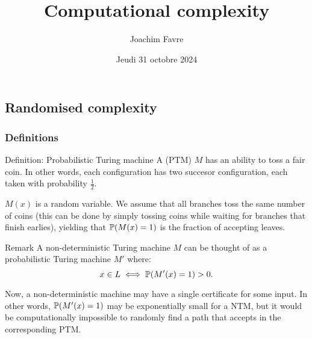 \documentclass[a4paper]{article}
\title{Computational complexity}
\author{Joachim Favre}
\date{Jeudi 31 octobre 2024}
\begin{document}
\maketitle


\subsection{Randomised complexity}

\subsubsection{Definitions}


\begin{parag}{Definition: Probabilistic Turing machine}
    A  (PTM) $M$ has an ability to toss a fair coin. In other words, each configuration has two succesor configuration, each taken with probability $\frac{1}{2}$.

    $M\left(x\right)$ is a random variable. We assume that all branches toss the same number of coins (this can be done by simply tossing coins while waiting for branches that finish earlies), yielding that $\prob\left(M\left(x\right) = 1\right)$ is the fraction of accepting leaves.

    \begin{subparag}{Remark}
        A non-deterministic Turing machine $M$ can be thought of as a probabilistic Turing machine $M'$ where: 
        \[x \in L \iff \prob\left(M'\left(x\right) = 1\right) > 0.\]

        Now, a non-deterministic machine may have a single certificate for some input. In other words, $\prob\left(M'\left(x\right) = 1\right)$ may be exponentially small for a NTM, but it would be computationally impossible to randomly find a path that accepts in the corresponding PTM.
    \end{subparag}
\end{parag}
\end{document}
